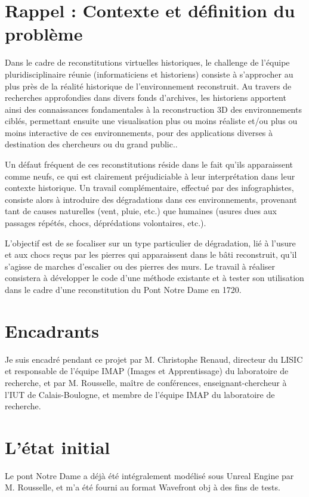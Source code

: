 \documentclass[a4paper,french]{report}
\begin{document}
		\section{Rappel : Contexte et définition du problème}
			Dans le cadre de reconstitutions virtuelles historiques,  le challenge de l'équipe pluridisciplinaire réunie (informaticiens et historiens) consiste à s'approcher au plus près de la réalité historique de l'environnement reconstruit. Au travers de recherches approfondies dans divers fonds d'archives, les historiens apportent ainsi des connaissances fondamentales à la reconstruction 3D des environnements ciblés, permettant ensuite une visualisation plus ou moins réaliste et/ou plus ou moins interactive de ces environnements, pour des applications diverses à destination des chercheurs ou du grand public.. \par
			Un défaut fréquent de ces reconstitutions réside dans le fait qu'ils apparaissent comme neufs, ce qui est clairement préjudiciable à leur interprétation dans leur contexte historique. Un travail complémentaire, effectué par des infographistes, consiste alors à introduire des dégradations dans ces environnements, provenant tant de causes naturelles (vent, pluie, etc.) que humaines (usures dues aux passages répétés, chocs, déprédations volontaires, etc.). \par
			L'objectif est de se focaliser sur un type particulier de dégradation, lié à l'usure et aux chocs reçus par les pierres qui apparaissent dans le bâti reconstruit, qu'il s'agisse de marches d'escalier ou des pierres des murs. Le travail à réaliser consistera à développer le code d'une méthode existante et à tester son utilisation dans le cadre d'une reconstitution du Pont Notre Dame en 1720.
		\section{Encadrants}
			Je suis encadré pendant ce projet par M. Christophe Renaud, directeur du LISIC et responsable de l'équipe IMAP (Images et Apprentissage) du laboratoire de recherche, et par M. Rousselle, maître de conférences, enseignant-chercheur à l'IUT de Calais-Boulogne, et membre de l'équipe IMAP du laboratoire de recherche.
		\section{L'état initial}
			Le pont Notre Dame a déjà été intégralement modélisé sous Unreal Engine par M. Rousselle, et m'a été fourni au format Wavefront obj à des fins de tests. 
\end{document}
